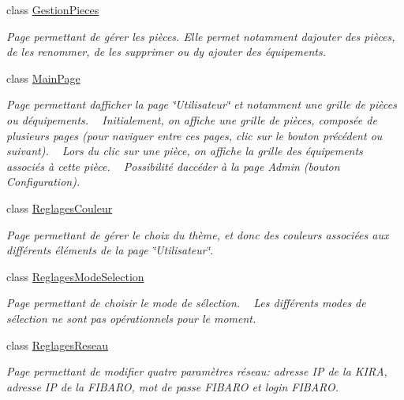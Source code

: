 \begin{DoxyCompactItemize}
class \hyperlink{class_my_domotik_1_1_gestion_pieces}{Gestion\+Pieces}
\begin{DoxyCompactList}\small\item\em Page permettant de gérer les pièces. Elle permet notamment d\textquotesingle{}ajouter des pièces, de les renommer, de les supprimer ou d\textquotesingle{}y ajouter des équipements. \end{DoxyCompactList}\item 
class \hyperlink{class_my_domotik_1_1_main_page}{Main\+Page}
\begin{DoxyCompactList}\small\item\em Page permettant d\textquotesingle{}afficher la page \char`\"{}\+Utilisateur\char`\"{} et notamment une grille de pièces ou d\textquotesingle{}équipements. ~\newline
Initialement, on affiche une grille de pièces, composée de plusieurs pages (pour naviguer entre ces pages, clic sur le bouton précédent ou suivant). ~\newline
Lors du clic sur une pièce, on affiche la grille des équipements associés à cette pièce. ~\newline
Possibilité d\textquotesingle{}accéder à la page Admin (bouton Configuration). \end{DoxyCompactList}\item 
class \hyperlink{class_my_domotik_1_1_reglages_couleur}{Reglages\+Couleur}
\begin{DoxyCompactList}\small\item\em Page permettant de gérer le choix du thème, et donc des couleurs associées aux différents éléments de la page \char`\"{}\+Utilisateur\char`\"{}. \end{DoxyCompactList}\item 
class \hyperlink{class_my_domotik_1_1_reglages_mode_selection}{Reglages\+Mode\+Selection}
\begin{DoxyCompactList}\small\item\em Page permettant de choisir le mode de sélection. ~\newline
Les différents modes de sélection ne sont pas opérationnels pour le moment. \end{DoxyCompactList}\item 
class \hyperlink{class_my_domotik_1_1_reglages_reseau}{Reglages\+Reseau}
\begin{DoxyCompactList}\small\item\em Page permettant de modifier quatre paramètres réseau\+: adresse IP de la K\+I\+RA, adresse IP de la F\+I\+B\+A\+RO, mot de passe F\+I\+B\+A\+RO et login F\+I\+B\+A\+RO. \end{DoxyCompactList}\item 

\end{DoxyCompactItemize}
